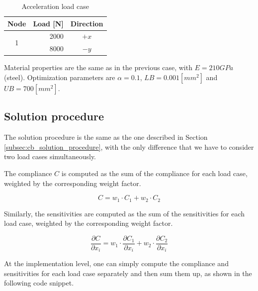 \begin{table}[H]
    \centering

    \begin{tabular}{|c|r|c|}
        \hline
        \textbf{Node}      & \textbf{Load [N]} & \textbf{Direction} \\
        \hline
        \multirow{2}{*}{1} & 2000              & $+x$               \\
                           & 8000              & $-y$               \\
        \hline
    \end{tabular}

    \caption{Acceleration load case}
    \label{tab:load_acceleration}

\end{table}

Material properties are the same as in the previous case, with $E = 210 GPa$ (steel).
Optimization parameters are $\alpha = 0.1$, $LB = 0.001 [mm^2]$ and $UB = 700 [mm^2]$.


\subsection{Solution procedure}
\label{subsec:mf_solution_procedure}

The solution procedure is the same as the one described in Section \ref{subsec:cb_solution_procedure}, with the only difference that we have to consider two load cases simultaneously.

The compliance $C$ is computed as the sum of the compliance for each load case, weighted by the corresponding weight factor.

\begin{equation}
    C = w_1 \cdot C_1 + w_2 \cdot C_2
\end{equation}

Similarly, the sensitivities are computed as the sum of the sensitivities for each load case, weighted by the corresponding weight factor.

\begin{equation}
    \frac{\partial C}{\partial x_i} = w_1 \cdot \frac{\partial C_1}{\partial x_i} + w_2 \cdot \frac{\partial C_2}{\partial x_i}
\end{equation}

At the implementation level, one can simply compute the compliance and sensitivities for each load case separately and then sum them up, as shown in the following code snippet.

